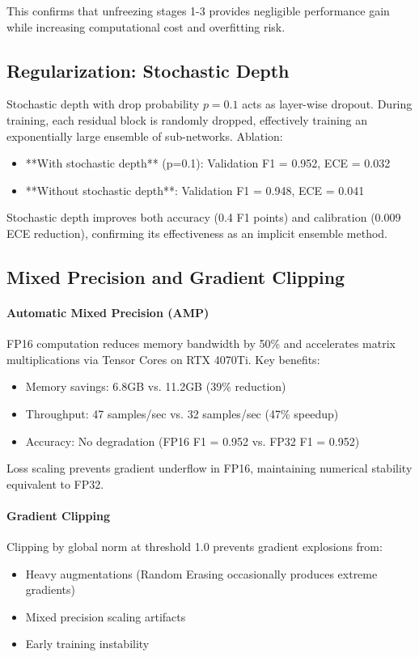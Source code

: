 \documentclass[11pt,a4paper]{article}
\begin{document}
This confirms that unfreezing stages 1-3 provides negligible performance gain while increasing computational cost and overfitting risk.

\subsection{Regularization: Stochastic Depth}

Stochastic depth \cite{huang2016stochasticdepth} with drop probability \(p=0.1\) acts as layer-wise dropout. During training, each residual block is randomly dropped, effectively training an exponentially large ensemble of sub-networks. Ablation:
\begin{itemize}[leftmargin=*]
\item **With stochastic depth** (p=0.1): Validation F1 = 0.952, ECE = 0.032
\item **Without stochastic depth**: Validation F1 = 0.948, ECE = 0.041
\end{itemize}

Stochastic depth improves both accuracy (0.4 F1 points) and calibration (0.009 ECE reduction), confirming its effectiveness as an implicit ensemble method.

\subsection{Mixed Precision and Gradient Clipping}

\paragraph{Automatic Mixed Precision (AMP)} FP16 computation reduces memory bandwidth by 50\% and accelerates matrix multiplications via Tensor Cores on RTX 4070Ti. Key benefits:
\begin{itemize}[leftmargin=*]
\item Memory savings: 6.8GB vs. 11.2GB (39\% reduction)
\item Throughput: 47 samples/sec vs. 32 samples/sec (47\% speedup)
\item Accuracy: No degradation (FP16 F1 = 0.952 vs. FP32 F1 = 0.952)
\end{itemize}

Loss scaling prevents gradient underflow in FP16, maintaining numerical stability equivalent to FP32.

\paragraph{Gradient Clipping} Clipping by global norm at threshold 1.0 prevents gradient explosions from:
\begin{itemize}[leftmargin=*]
\item Heavy augmentations (Random Erasing occasionally produces extreme gradients)
\item Mixed precision scaling artifacts
\item Early training instability
\end{itemize}
\end{document}

